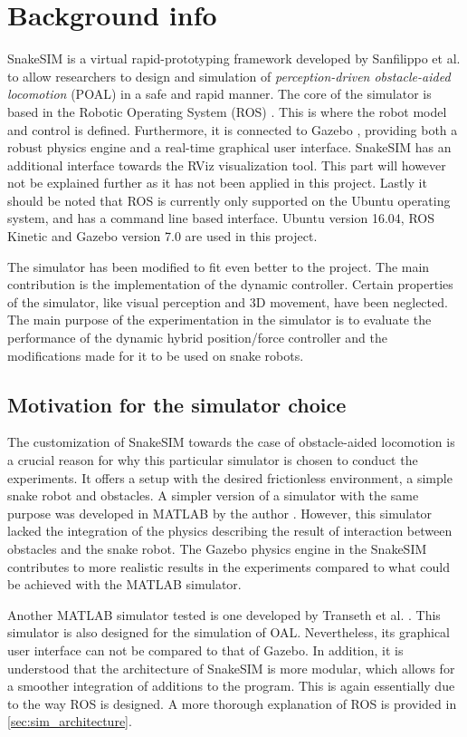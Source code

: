 \section{Background info}


SnakeSIM is a virtual rapid-prototyping framework developed by Sanfilippo et al. \cite{sanfilippo2018snakesim} to allow researchers to design and simulation of \textit{perception-driven obstacle-aided locomotion} (POAL) in a safe and rapid manner. The core of the simulator is based in the Robotic Operating System (ROS) \cite{quigley2009ros}. This is where the robot model and control is defined. Furthermore, it is connected to Gazebo \cite{koenig2004design}, providing both a robust physics engine and a real-time graphical user interface. SnakeSIM has an additional interface towards the RViz visualization tool. This part will however not be explained further as it has not been applied in this project. Lastly it should be noted that ROS is currently only supported on the Ubuntu operating system, and has a command line based interface. Ubuntu version 16.04, ROS Kinetic and Gazebo version 7.0 are used in this project.

The simulator has been modified to fit even better to the project. The main contribution is the implementation of the dynamic controller. Certain properties of the simulator, like visual perception and 3D movement, have been neglected.
The main purpose of the experimentation in the simulator is to evaluate the performance of the dynamic hybrid position/force controller and the modifications made for it to be used on snake robots. 

\subsection{Motivation for the simulator choice}

The customization of SnakeSIM towards the case of obstacle-aided locomotion is a crucial reason for why this particular simulator is chosen to conduct the experiments. It offers a setup with the desired frictionless environment, a simple snake robot and obstacles. A simpler version of a simulator with the same purpose was developed in MATLAB by the author \cite{AtussaProsjektoppgp}. However, this simulator lacked the integration of the physics describing the result of interaction between obstacles and the snake robot. The Gazebo physics engine in the SnakeSIM contributes to more realistic results in the experiments compared to what could be achieved with the MATLAB simulator.

Another MATLAB simulator tested is one developed by Transeth et al. \cite{transeth2008snake}. This simulator is also designed for the simulation of OAL. Nevertheless, its graphical user interface can not be compared to that of Gazebo. In addition, it is understood that the architecture of SnakeSIM is more modular, which allows for a smoother integration of additions to the program. This is again essentially due to the way ROS is designed. A more thorough explanation of ROS is provided in \ref{sec:sim_architecture}.